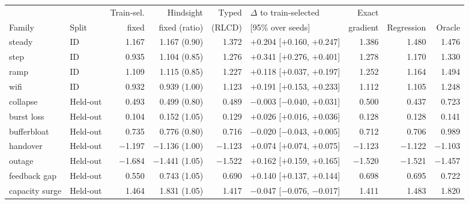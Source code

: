 \begin{tabular}{llrrrlrrr}
\toprule
 & & Train-sel. & Hindsight & Typed & $\Delta$ to train-selected & Exact & & \\
Family & Split & fixed & fixed (ratio) & (RLCD) & [95\% over seeds] & gradient & Regression & Oracle \\
\midrule
steady & ID & 1.167 & 1.167 (0.90) & 1.372 & $+$0.204 [$+$0.160, $+$0.247] & 1.386 & 1.480 & 1.476 \\
step & ID & 0.935 & 1.104 (0.85) & 1.276 & $+$0.341 [$+$0.276, $+$0.401] & 1.278 & 1.170 & 1.330 \\
ramp & ID & 1.109 & 1.115 (0.85) & 1.227 & $+$0.118 [$+$0.037, $+$0.197] & 1.252 & 1.164 & 1.494 \\
wifi & ID & 0.932 & 0.939 (1.00) & 1.123 & $+$0.191 [$+$0.153, $+$0.233] & 1.112 & 1.105 & 1.248 \\
collapse & Held-out & 0.493 & 0.499 (0.80) & 0.489 & $-$0.003 [$-$0.040, $+$0.031] & 0.500 & 0.437 & 0.723 \\
burst loss & Held-out & 0.104 & 0.152 (1.05) & 0.129 & $+$0.026 [$+$0.016, $+$0.036] & 0.128 & 0.128 & 0.141 \\
bufferbloat & Held-out & 0.735 & 0.776 (0.80) & 0.716 & $-$0.020 [$-$0.043, $+$0.005] & 0.712 & 0.706 & 0.989 \\
handover & Held-out & $-$1.197 & $-$1.136 (1.00) & $-$1.123 & $+$0.074 [$+$0.074, $+$0.075] & $-$1.123 & $-$1.122 & $-$1.103 \\
outage & Held-out & $-$1.684 & $-$1.441 (1.05) & $-$1.522 & $+$0.162 [$+$0.159, $+$0.165] & $-$1.520 & $-$1.521 & $-$1.457 \\
feedback gap & Held-out & 0.550 & 0.743 (1.05) & 0.690 & $+$0.140 [$+$0.137, $+$0.144] & 0.698 & 0.695 & 0.722 \\
capacity surge & Held-out & 1.464 & 1.831 (1.05) & 1.417 & $-$0.047 [$-$0.076, $-$0.017] & 1.411 & 1.483 & 1.820 \\
\bottomrule
\end{tabular}
